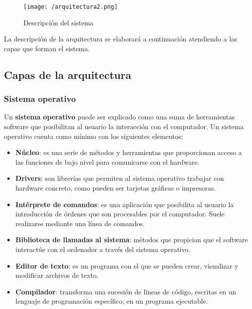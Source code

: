 \begin{figure}[!h]
\begin{center}
\texttt{[image: /arquitectura2.png]}
\caption[Descripción del sistema]{Descripción del sistema}
\label{fig:descripcion}
\end{center}
\end{figure}

La descripción de la arquitectura se elaborará a continuación atendiendo a las capas que forman el sistema.

\subsection{Capas de la arquitectura}
\label{sec:capas}

\subsubsection{Sistema operativo}
\label{sec:sistemaoperativo}

Un \textbf{sistema operativo} puede ser explicado como una suma de herramientas software que posibilitan al usuario la interacción con el computador. Un sistema operativo cuenta como mínimo con los siguientes elementos:

\begin{itemize}
\item \textbf{Núcleo}: es una serie de métodos y herramientas que proporcionan acceso a las funciones de bajo nivel para comunicarse con el hardware. 
\item \textbf{Drivers}: son librerías que permiten al sistema operativo trabajar con hardware concreto, como pueden ser tarjetas gráficas o impresoras. 
\item \textbf{Intérprete de comandos}: es una aplicación que posibilita al usuario la introducción de órdenes que son procesables por el computador. Suele realizarse mediante una línea de comandos.
\item \textbf{Biblioteca de llamadas al sistema}: métodos que propician que el software interactúe con el ordenador a través del sistema operativo.
\item \textbf{Editor de texto}: es un programa con el que se pueden crear, visualizar y modificar archivos de texto.
\item \textbf{Compilador}: transforma una sucesión de líneas de código, escritas en un lenguaje de programación específico, en un programa ejecutable.
\end{itemize} 

